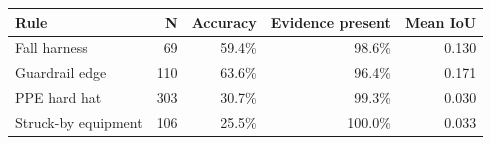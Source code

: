 \begin{tabular}{lrrrr}
\toprule
Rule & N & Accuracy & Evidence present & Mean IoU \\
\midrule
Fall harness & 69 & 59.4\% & 98.6\% & 0.130 \\
Guardrail edge & 110 & 63.6\% & 96.4\% & 0.171 \\
PPE hard hat & 303 & 30.7\% & 99.3\% & 0.030 \\
Struck-by equipment & 106 & 25.5\% & 100.0\% & 0.033 \\
\bottomrule
\end{tabular}
